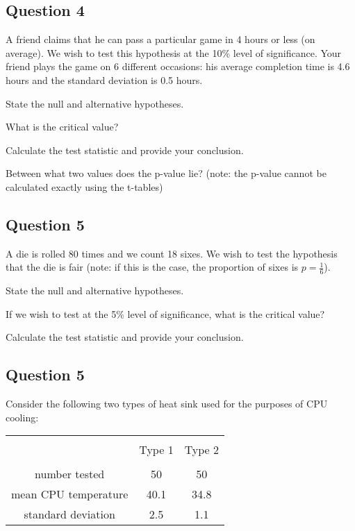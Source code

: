 \subsection*{Question 4}
A friend claims that he can pass a particular game in 4 hours or less (on average). We wish to test this hypothesis at the 10\% level of significance. Your friend plays the game on 6 different occasions: his average completion time is 4.6 hours and the standard deviation is 0.5 hours. \\[-0.2cm]

\item  State the null and alternative hypotheses. 
\item  What is the critical value? 
\item  Calculate the test statistic and provide your conclusion. 
\item  Between what two values does the p-value lie? (note: the p-value cannot be calculated exactly using the t-tables)



\subsection*{Question 5}
A die is rolled 80 times and we count 18 sixes. We wish to test the hypothesis that the die is fair (note: if this is the case, the proportion of sixes is $p = \frac{1}{6}$). \\[-0.2cm]

\item  State the null and alternative hypotheses. 
\item  If we wish to test at the 5\% level of significance, what is the critical value? 
\item  Calculate the test statistic and provide your conclusion.



\newpage\subsection*{Question 5}
Consider the following two types of heat sink used for the purposes of CPU cooling:\\[-0.4cm]
\begin{center}
\begin{tabular}{|c|c|c|}
\hline
&&\\[-0.3cm]
& Type 1 & Type 2 \\
\hline
&&\\[-0.3cm]
number tested      & 50 & 50 \\
mean CPU temperature   & 40.1  & 34.8 \\
standard deviation &  2.5 & 1.1 \\[0.1cm]
\hline
\end{tabular}
\end{center}

